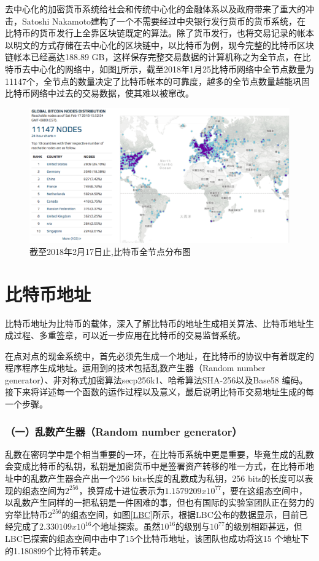 		去中⼼化的加密货币系统给社会和传统中⼼化的⾦融体系以及政府带来了重⼤的冲击，Satoshi Nakamoto建构了一个不需要经过中央银行发行货币的货币系统，在比特币的货币发行上全靠区块链既定的算法。除了货币发行，也将交易记录的帐本以明文的方式存储在去中心化的区块链中，以比特币为例，现今完整的比特币区块链帐本已经高达188.89 GB，这样保存完整交易数据的计算机称之为全节点，在比特币去中心化的网络中，如图\ref{bitcoinfullnode}所示，截至2018年1月25比特币网络中全节点数量为11147个\supercite{bitcoinfullnode}，全节点的数量决定了比特币帐本的可靠度，越多的全节点数量越能巩固⽐特币网络中过去的交易数据，使其难以被窜改。

		\begin{figure}
			\centering
			\includegraphics[width = .9\textwidth]{bitcoinfullnode.png}
			\caption{截至2018年2月17日止,⽐特币全节点分布图\supercite{bitcoinfullnode}}\label{bitcoinfullnode}
		\end{figure}


		\section{比特币地址}
		⽐特币地址为⽐特币的载体，深⼊了解⽐特币的地址⽣成相关算法、⽐特币地址⽣成过程、多重签章，可以近⼀步应⽤在比特币的交易监督系统。
		
		在点对点的现金系统中，首先必须先生成一个地址，在比特币的协议中有着既定的程序程序生成地址。运用到的技术包括乱数产生器（Random number generator）、非对称式加密算法secp256k1\supercite{johnson2001elliptic}、哈希算法SHA-256\supercite{DBLP:conf/fse/KhovratovichRS12}以及Base58 编码\supercite{Base58}。接下来将详述每一个函数的运作过程以及意义，最后说明比特币交易地址生成的每一个步骤。
			
				\subsubsection{（一）乱数产生器（Random number generator）}
				乱数在密码学中是个相当重要的一环，在比特币系统中更是重要，毕竟生成的乱数会变成比特币的私钥，私钥是加密货币中是签署资产转移的唯一方式，在比特币地址中的乱数产生器会产出一个256 bits长度的乱数成为私钥，256 bits的长度可以表现的组态空间为$2^{256}$，换算成十进位表示为$1.1579209x10^{77}$，要在这组态空间中，以乱数产生同样的一把私钥是一件困难的事，但也有国际的实验室\supercite{TheLargeBitcoinCollider}团队正在努力的穷举比特币$2^{256}$的组态空间，如图\ref{LBC}所示，根据LBC公布的数据显示，目前已经完成了$2.330109x10^{16}$个地址探索。虽然$10^{16}$的级别与$10^{77}$的级别相距甚远，但LBC已探索的组态空间中击中了15个比特币地址，该团队也成功将这15 个地址下的1.180899个比特币转走。

